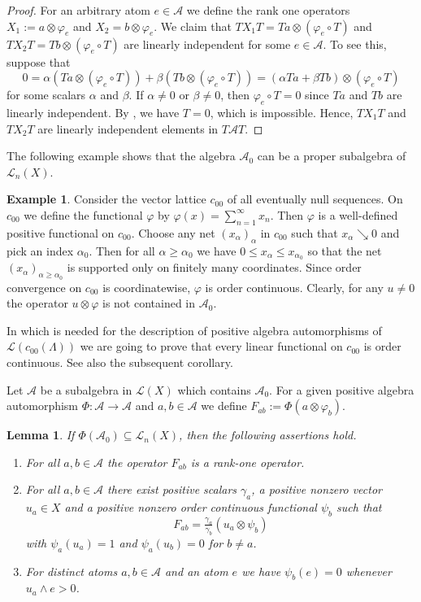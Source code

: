 \documentclass[12pt,reqno]{amsart}
\theoremstyle{plain}
\newtheorem{lemma}[theorem]{Lemma}
\theoremstyle{definition}
\newtheorem{example}[theorem]{Example}
\begin{document}
\begin{proof}
For an arbitrary atom $e\in \mathcal A$ we define the rank one operators $X_1:=a\otimes \varphi_e$ and $X_2=b\otimes \varphi_e$. We claim that $TX_1T=Ta\otimes (\varphi_e\circ T)$ and $TX_2T=Tb\otimes (\varphi_e\circ T)$ are linearly independent for some $e\in \mathcal A$. To see this, suppose that
$$0 = \alpha (Ta\otimes (\varphi_e\circ T)) + \beta (Tb\otimes (\varphi_e\circ T)) = (\alpha Ta+\beta Tb)\otimes (\varphi_e\circ T) $$
for some scalars $\alpha$ and $\beta$. If $\alpha\neq 0$ or $\beta\neq 0$, then $\varphi_e\circ T=0$ since $Ta$ and $Tb$ are linearly independent.
By , we have $T=0$, which is impossible. Hence, $TX_1T$ and $TX_2T$ are linearly independent elements in $T\mathscr AT$.
\end{proof}

The following example shows that the algebra $\mathscr A_0$ can be a proper subalgebra of $\mathscr L_n(X)$. 

\begin{example}
    Consider the vector lattice $c_{00}$ of all eventually null sequences. On $c_{00}$ we define the functional $\varphi$ by $\varphi(x)=\sum_{n=1}^\infty x_n$. Then $\varphi$ is a well-defined positive functional on $c_{00}$. Choose any net $(x_\alpha)_\alpha$ in $c_{00}$ such that $x_\alpha\searrow 0$ and pick an index $\alpha_0$. Then for all $\alpha\geq \alpha_0$ we have $0\leq x_\alpha \leq x_{\alpha_0}$ so that the net $(x_\alpha)_{\alpha\geq \alpha_0}$ is supported only on finitely many coordinates.  Since order convergence on $c_{00}$ is coordinatewise, $\varphi$ is order continuous. Clearly, for any $u\neq 0$ the operator $u\otimes \varphi$ is not contained in $\mathscr A_0$. 
\end{example}

In  which is needed for the description of positive algebra automorphisms of $\mathscr L(c_{00}(\Lambda))$ we are going to prove that every linear functional on $c_{00}$ is order continuous. See also the subsequent corollary. 

Let $\mathscr A$ be a subalgebra in $\mathscr L(X)$ which contains $\mathscr A_0$. For a given positive algebra automorphism $\Phi\colon \mathscr A\to \mathscr A$ and $a,b\in \mathcal A$ we define $F_{ab}:=\Phi(a\otimes \varphi_b)$.

\begin{lemma}\label{lema o delti}
If $\Phi(\mathscr A_0)\subseteq \mathscr L_n(X)$, then the following assertions hold.
\begin{enumerate}
\item For all $a,b\in \mathcal A$ the operator $F_{ab}$ is a rank-one operator.
\item For all $a,b\in \mathcal A$ there exist positive scalars $\gamma_a$, a positive nonzero vector $u_a\in X$ and a positive nonzero order continuous functional $\psi_b$ such that
    $$F_{ab}=\tfrac{\gamma_a}{\gamma_b} (u_a\otimes \psi_b)$$
    with $\psi_a(u_a)=1$ and $\psi_a(u_b)=0$ for $b\neq a$.
\item For distinct atoms $a,b\in \mathcal A$ and an atom $e$ we have $\psi_b(e)=0$ whenever $u_a\wedge e >0$.
\end{enumerate}
\end{lemma}
\end{document}
